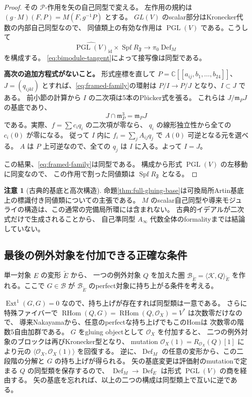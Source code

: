 \documentclass[a4paper,11pt]{ltjsarticle}
\theoremstyle{definition}
\newtheorem{remark}[theorem]{注意}
\newcommand{\CC}{\mathbb C}
\newcommand{\OO}{\mathcal O}
\newcommand{\Spf}{\operatorname{Spf}}
\newcommand{\Def}{\operatorname{Def}}
\newcommand{\Ext}{\operatorname{Ext}}
\newcommand{\RHom}{\operatorname{RHom}}
\newcommand{\id}{\operatorname{id}}
\begin{document}
\begin{proof}
その $\mathcal P$-作用を矢の自己同型で変える。
左作用の規約は $(g\cdot M)(F,P)=M(F,g^{-1}P)$ とする。
$GL(V)$ のscalar部分はKronecker代数の内部自己同型なので、
同値類上の有効な作用は $\operatorname{PGL}(V)$ である。こうして
\begin{equation}\label{eq:framed-family}
 \widehat{\operatorname{PGL}(V)}_{\id}\times\Spf R_{\mathfrak F}
 \longrightarrow\pi_0\Def_M
\end{equation}
を構成する。
\eqref{eq:bimodule-tangent}によって接写像は同型である。

\textbf{高次の追加方程式がないこと。}
形式座標を直して $P=\CC[[a_{ij},b_1,\ldots,b_{24}]]$、
$J=(q_{ijkl})$ とすれば、\eqref{eq:framed-family}の環射は
$P/I\to P/J$ となり、$I\subset J$ である。
前小節の計算から $I$ の二次項は5本のPlücker式を張る。
これらは $J/\mathfrak m_PJ$ の基底であり、
\[
 J\cap\mathfrak m_P^3=\mathfrak m_PJ
\]
である。実際、$f=\sum c_iq_i$ の二次項が零なら、
$q_i$ の線形独立性から全ての $c_i(0)$ が零になる。
従って $I$ 内に $f_i=\sum_j A_{ij}q_j$ で $A(0)$ 可逆となる元を選べる。
$A$ は $P$ 上可逆なので、全ての $q_j$ は $I$ に入る。よって $I=J$。

この結果、\eqref{eq:framed-family}は同型である。
構成から形式 $\operatorname{PGL}(V)$ の左移動に同変なので、
この作用で割った同値類は $\Spf R_{\mathfrak F}$ となる。
\end{proof}

\begin{remark}[古典的基底と高次構造]
命題\ref{thm:full-gluing-base}は可換局所Artin基底上の標識付き同値類についての主張である。
$M$ のscalar自己同型や導来モジュライの構造は、この通常の完備局所環には含まれない。
古典的イデアルが二次式だけで生成されることから、
自己準同型 $A_\infty$ 代数全体のformalityまでは結論していない。
\end{remark}

\subsection{最後の例外対象を付加できる正確な条件}

単一対象 $E$ の変形 $\widetilde E$ から、
一つの例外対象 $Q$ を加えた圏
$\mathcal B_{\widetilde E}=\langle\mathcal K,Q\rangle_{\widetilde E}$
を作れる。ここで $G\in\mathcal B$ が
$\mathcal B_{\widetilde E}$ のperfect対象に持ち上がる条件を考える。

$\Ext^1(G,G)=0$ なので、持ち上げが存在すれば同型類は一意である。
さらに特殊ファイバーで
$\RHom(Q,G)=\RHom(Q,\OO_X)=V^*$ は次数零だけなので、
導来Nakayamaから、任意のperfectな持ち上げでもこのHomは
次数零の階数5自由加群である。
$G$ をgluing objectとして $\OO_X$ を付加すると、
二つの例外対象のブロックは再びKronecker型となり、
mutation $\OO_X(1)=R_{\OO_X}(Q)[1]$ により元の
$\langle\OO_X,\OO_X(1)\rangle$ を回復する。
逆に、$\Def_M$ の任意の変形から、この二段階の分解と $G$ の持ち上げが得られる。
矢の基底変更は評価射のmutationで定まる $Q$ の同型類を保存するので、
$\Def_M\to\Def_E$ は形式 $\operatorname{PGL}(V)$ の商を経由する。
矢の基底を忘れれば、以上の二つの構成は同型類上で互いに逆である。
\end{document}
